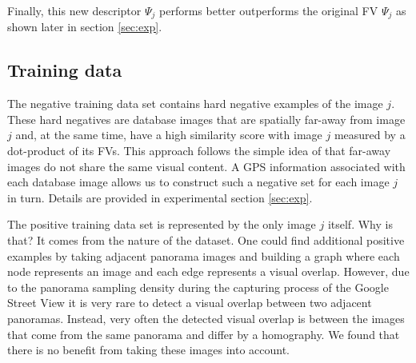 \documentclass[table]{article} %
\begin{document}
        Finally, this new descriptor $\Psi_j$ performs better outperforms the original FV $\Psi_j$ as shown later in section \ref{sec:exp}.



    \subsection{Training data}
      	The negative training data set contains hard negative examples of the image $j$. These hard negatives are database images that are spatially far-away from image $j$ and, at the same time, have a high similarity score with image $j$ measured by a dot-product of its FVs. This approach follows the simple idea of \cite{Knopp2010} that far-away images do not share the same visual content. A GPS information associated with each database image allows us to construct such a negative set for each image $j$ in turn. Details are provided in experimental section \ref{sec:exp}.

      	The positive training data set is represented by the only image $j$ itself. Why is that? It comes from the nature of the dataset. One could find additional positive examples by taking adjacent panorama images and building a graph where each node represents an image and each edge represents a visual overlap. However, due to the panorama sampling density during the capturing process of the Google Street View it is very rare to detect a visual overlap between two adjacent panoramas. Instead, very often the detected visual overlap is between the images that come from the same panorama and differ by a homography. We found that there is no benefit from taking these images into account.


\end{document}
